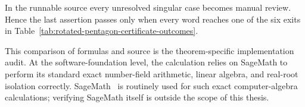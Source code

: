 In the runnable source every unresolved singular case becomes manual review.
Hence the last assertion passes only when every word reaches one of the six
exits in Table~\ref{tab:rotated-pentagon-certificate-outcomes}.

This comparison of formulas and source is the theorem-specific implementation
audit.  At the software-foundation level, the calculation relies on SageMath
to perform its standard exact number-field arithmetic, linear algebra, and
real-root isolation correctly.  SageMath~\cite{SageMath107} is routinely used
for such exact computer-algebra calculations; verifying SageMath itself is
outside the scope of this thesis.
